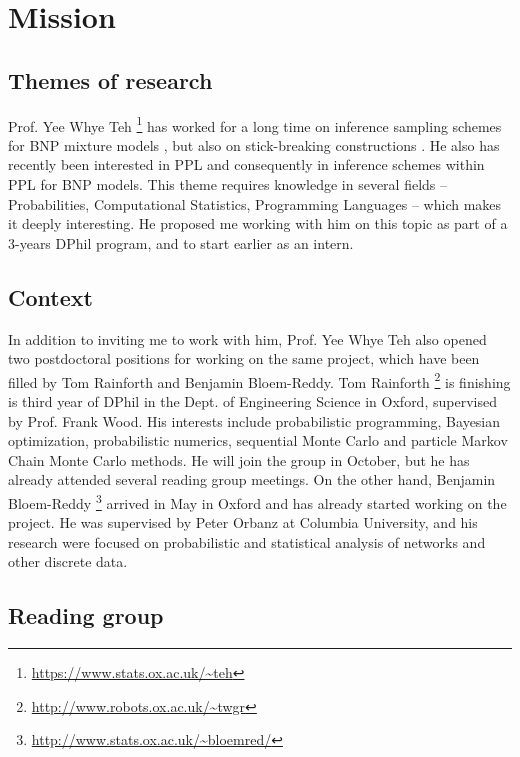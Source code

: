 
\chapter{Mission}
\section{Themes of research}
Prof. Yee Whye Teh \footnote{\url{https://www.stats.ox.ac.uk/~teh}} has worked for a long time on inference sampling schemes for \gls{BNP} mixture models \cite{Favaro:2013fl, Favaro:2014kg, Lomeli:2015vd, Lomeli:2017kp}, but also on stick-breaking constructions \cite{stick-breaking-ibp, Favaro:2014bo}.
He also has recently been interested in \gls{PPL} and consequently in inference schemes within \gls{PPL} for \gls{BNP} models.
This theme requires knowledge in several fields -- Probabilities, Computational Statistics, Programming Languages -- which makes it deeply interesting.
He proposed me working with him on this topic as part of a 3-years DPhil program, and to start earlier as an intern.

\section{Context}
In addition to inviting me to work with him, Prof. Yee Whye Teh also opened two postdoctoral positions for working on the same project, which have been filled by Tom Rainforth and Benjamin Bloem-Reddy. 
Tom Rainforth \footnote{\url{http://www.robots.ox.ac.uk/~twgr}} is finishing is third year of DPhil in the Dept. of Engineering Science in Oxford, supervised by Prof. Frank Wood. His interests include  probabilistic programming, Bayesian optimization, probabilistic numerics, sequential Monte Carlo and particle Markov Chain Monte Carlo methods. He will join the group in October, but he has already attended several reading group meetings.
On the other hand, Benjamin Bloem-Reddy \footnote{\url{http://www.stats.ox.ac.uk/~bloemred/}} arrived in May in Oxford and has already started working on the project. He was supervised by Peter Orbanz at Columbia University, and his research were focused on probabilistic and statistical analysis of networks and other discrete data.

\section{Reading group}

